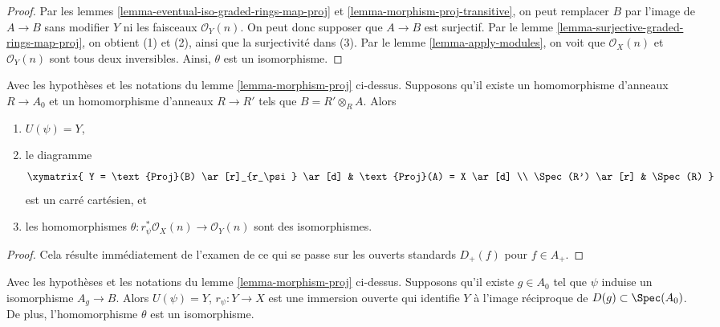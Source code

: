 \begin{proof}
Par les lemmes \ref{lemma-eventual-iso-graded-rings-map-proj} et
\ref{lemma-morphism-proj-transitive},
on peut remplacer $B$ par l'image de $A \to B$
sans modifier $Y$ ni les faisceaux $\mathcal{O}_Y(n)$.
On peut donc supposer que $A \to B$ est surjectif. Par le
lemme \ref{lemma-surjective-graded-rings-map-proj}, on obtient (1) et (2),
ainsi que la surjectivité dans (3).
Par le lemme \ref{lemma-apply-modules}, on voit que
$\mathcal{O}_X(n)$ et $\mathcal{O}_Y(n)$
sont tous deux inversibles. Ainsi, $\theta$ est un isomorphisme.
\end{proof}

\begin{lemma}
\label{lemma-base-change-map-proj}
\begin{reference}
\cite[II, Proposition 2.8.10]{EGA}
\end{reference}
Avec les hypothèses et les notations du lemme \ref{lemma-morphism-proj} ci-dessus.
Supposons qu'il existe un homomorphisme d'anneaux $R \to A_0$ et un homomorphisme d'anneaux
$R \to R'$ tels que $B = R' \otimes_R A$. Alors
\begin{enumerate}
\item $U(\psi) = Y$,
\item le diagramme
$$
\xymatrix{
Y = \text{Proj}(B) \ar[r]_{r_\psi} \ar[d] &
\text{Proj}(A) = X \ar[d] \\
\Spec(R') \ar[r] &
\Spec(R)
}
$$
est un carré cartésien, et
\item les homomorphismes $\theta : r_\psi^*\mathcal{O}_X(n) \to \mathcal{O}_Y(n)$
sont des isomorphismes.
\end{enumerate}
\end{lemma}

\begin{proof}
Cela résulte immédiatement de l'examen de ce qui se passe sur les ouverts
standards $D_{+}(f)$ pour $f \in A_{+}$.
\end{proof}

\begin{lemma}
\label{lemma-localization-map-proj}
Avec les hypothèses et les notations du lemme \ref{lemma-morphism-proj} ci-dessus.
Supposons qu'il existe $g \in A_0$ tel que $\psi$ induise un
isomorphisme $A_g \to B$. Alors
$U(\psi) = Y$, $r_\psi : Y \to X$ est une immersion ouverte
qui identifie $Y$ à l'image réciproque
de $D(g) \subset \Spec(A_0)$. De plus, l'homomorphisme $\theta$
est un isomorphisme.
\end{lemma}

